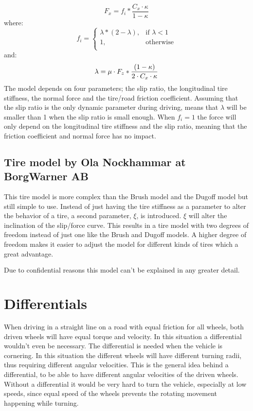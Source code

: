\begin{equation}
F_{x} = f_{i}*\frac{C_{x} \cdot \kappa}{1-\kappa}
\end{equation}
where:
\begin{equation}
f_{i}=
\begin{cases}
	\lambda*(2-\lambda), & \text{if } \lambda < 1 \\
	1, & \text{otherwise} \\
\end{cases}
\end{equation}
and:
\begin{equation}
	\lambda = \mu \cdot F_{z} * \frac{(1-\kappa)}{2 \cdot C_{x} \cdot \kappa} \\
\end{equation}
The model depends on four parameters; the slip ratio, the longitudinal tire stiffness, the normal force and the tire/road friction coefficient. Assuming that the slip ratio is the only dynamic parameter during driving, means that $ \lambda $ will be smaller than 1 when the slip ratio is small enough. When $ f_{i} = 1 $ the force will only depend on the longitudinal tire stiffness and the slip ratio, meaning that the friction coefficient and normal force has no impact. 

\subsection{Tire model by Ola Nockhammar at BorgWarner AB}
This tire model is more complex than the Brush model and the Dugoff model but still simple to use. Instead of just having the tire stiffness as a parameter to alter the behavior of a tire, a second parameter, $ \xi $, is introduced. $ \xi $ will alter the inclination of the slip/force curve. This results in a tire model with two degrees of freedom instead of just one like the Brush and Dugoff models. A higher degree of freedom makes it easier to adjust the model for different kinds of tires which a great advantage.

Due to confidential reasons this model can't be explained in any greater detail.   

\section{Differentials}
When driving in a straight line on a road with equal friction for all wheels, both driven wheels will have equal torque and velocity. In this situation a differential wouldn't even be necessary. The differential is needed when the vehicle is cornering. In this situation the different wheels will have different turning radii, thus requiring different angular velocities. This is the general idea behind a differential, to be able to have different angular velocities of the driven wheels. Without a differential it would be very hard to turn the vehicle, especially at low speeds, since equal speed of the wheels prevents the rotating movement happening while turning.

